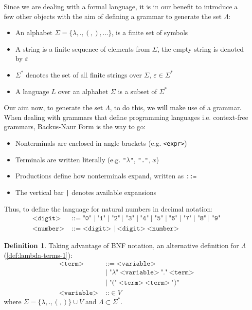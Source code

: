\documentclass[12pt]{book}
\newcommand{\la}{\lambda}
\newcommand{\La}{\Lambda}
\newcommand{\Vset}{V}
\theoremstyle{plain}
\theoremstyle{definition}
\newtheorem{definition}{Definition}[section]
\theoremstyle{definition}
\theoremstyle{definition}
\begin{document}
Since we are dealing with a formal language, it is in our benefit to introduce a few other objects with the aim of defining a grammar to generate the set $\La$:
\begin{itemize}
\item An alphabet \( \Sigma = \{ \la, ., (, ), \ldots \} \), is a finite set of symbols
\item A string is a finite sequence of elements from \( \Sigma \), the empty string is denoted by \( \varepsilon \)
\item \( \Sigma^* \) denotes the set of all finite strings over \( \Sigma \), \( \varepsilon \in \Sigma^* \)
\item A language \( L \) over an alphabet \( \Sigma \) is a subset of \( \Sigma^* \)
\end{itemize}
Our aim now, to generate the set $\La$,  to do this, we will make use of a grammar. When dealing with grammars that define programming languages i.e. context-free grammars, Backus-Naur Form is the way to go:
\begin{itemize}
\item Nonterminals are enclosed in angle brackets (e.g. \texttt{<expr>})
\item Terminals are written literally (e.g. \texttt{"$\lambda$"}, \texttt{"."}, $x$)
\item Productions define how nonterminals expand, written as \texttt{::=}
\item The vertical bar \texttt{|} denotes available expansions
\end{itemize}
Thus, to define the language for natural numbers in decimal notation:
\begin{align*}
  \texttt{<digit>} &\;\texttt{::=}\; \texttt{"0"} \;|\; \texttt{"1"} \;|\; \texttt{"2"} \;|\; \texttt{"3"} \;|\; \texttt{"4"} \;|\; \texttt{"5"} \;|\; \texttt{"6"} \;|\; \texttt{"7"} \;|\; \texttt{"8"} \;|\; \texttt{"9"} \\
  \texttt{<number>} &\;\texttt{::=}\; \texttt{<digit>} \;|\; \texttt{<digit>} \ \texttt{<number>}
\end{align*}
\begin{definition} Taking advantage of BNF notation, an alternative definition for $\La$ (\ref{def:lambda-terms-1}):
  \begin{align*}
    \texttt{<term>} &\;\texttt{::=}\; \texttt{<variable>} \\
                    &\;|\; \texttt{"$\la$"}\ \texttt{<variable>}\ \texttt{"."}\ \texttt{<term>} \\
                    &\;|\; \texttt{"("}\ \texttt{<term>}\ \texttt{<term>}\ \texttt{")"} \\
    \texttt{<variable>} &\;\texttt{::}\in V
  \end{align*}
  \label{def:lambda-terms-2}
  where \( \Sigma = \{ \la, ., (, )\} \cup \Vset \) and \( \La \subset \Sigma^* \).
\end{definition}
\end{document}
